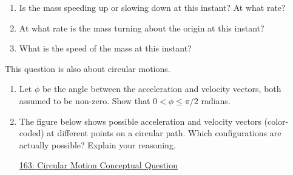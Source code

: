 \documentclass{ximera}
\begin{document}
\begin{question}
\begin{enumerate}
\begin{enumerate}
\item Is the mass speeding up or slowing down at this instant? At what rate?

\item At what rate is the mass turning about the origin at this instant?

\item What is the speed of the mass at this instant?
\end{enumerate}

\end{enumerate}

\end{question}

\begin{question}  \label{Q32frr3r4r4}
This question is also about circular motions.
\begin{enumerate}

\item Let $\phi$ be the angle between the acceleration and velocity vectors, both assumed to be non-zero. Show that $0< \phi \leq \pi/2$ radians.

\item The figure below shows possible acceleration and velocity vectors (color-coded) at different points on a circular path. Which configurations are actually possible? Explain your reasoning.

\begin{onlineOnly}
    \begin{center}
\end{center}
\end{onlineOnly}

\href{https://www.geogebra.org/classic/yzcwddhb}{163: Circular Motion Conceptual Question}

\end{enumerate}

\end{question}
\end{document}
